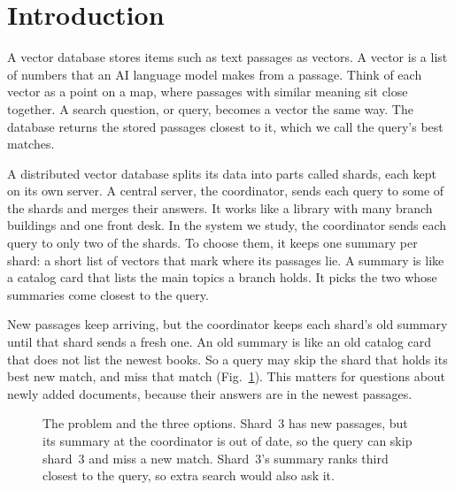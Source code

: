 \section{Introduction}
\label{sec:intro}

A vector database stores items such as text passages as vectors.
A vector is a list of numbers that an AI language model makes from a passage.
Think of each vector as a point on a map, where passages with similar meaning sit close together.
A search question, or query, becomes a vector the same way.
The database returns the stored passages closest to it, which we call the query's best matches.

A distributed vector database splits its data into parts called shards, each kept on its own server.
A central server, the coordinator, sends each query to some of the shards and merges their answers.
It works like a library with many branch buildings and one front desk.
In the system we study, the coordinator sends each query to only two of the \RNumNumShards{} shards.
To choose them, it keeps one summary per shard: a short list of vectors that mark where its passages lie.
A summary is like a catalog card that lists the main topics a branch holds.
It picks the two whose summaries come closest to the query.

New passages keep arriving, but the coordinator keeps each shard's old summary until that shard sends a fresh one.
An old summary is like an old catalog card that does not list the newest books.
So a query may skip the shard that holds its best new match, and miss that match (Fig.~\ref{fig:problem}).
This matters for questions about newly added documents, because their answers are in the newest passages.

\begin{figure}[!t]
\centering

\caption{The problem and the three options. Shard~3 has new passages, but its summary at the coordinator is out of date, so the query can skip shard~3 and miss a new match. Shard~3's summary ranks third closest to the query, so extra search would also ask it.}
\label{fig:problem}
\end{figure}

